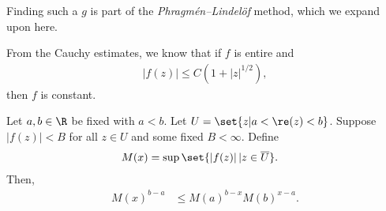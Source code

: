 \documentclass[10pt]{mypackage}
\begin{document}
Finding such a $g$ is part of the \textit{Phragmén--Lindelöf} method, which we expand upon here.
\begin{example}
  From the Cauchy estimates, we know that if $f$ is entire and
  \begin{align*}
    \left\vert f(z) \right\vert \leq C\left( 1 + \left\vert z \right\vert^{1/2} \right),
  \end{align*}
  then $f$ is constant.
\end{example}
\begin{theorem}
  Let $a,b\in \R$ be fixed with $ a < b $. Let $U = \set{z | a < \re(z) < b}$. Suppose $\left\vert f(z) \right\vert < B$ for all $z\in U$ and some fixed $B < \infty$. Define
  \begin{align*}
    M(x) &= \sup\set{\left\vert f(z) \right\vert | z\in \overline{U}}.
  \end{align*}
  Then,
  \begin{align*}
    M(x)^{b-a} &\leq M(a)^{b-x}M(b)^{x-a}.
  \end{align*}
\end{theorem}
\end{document}

